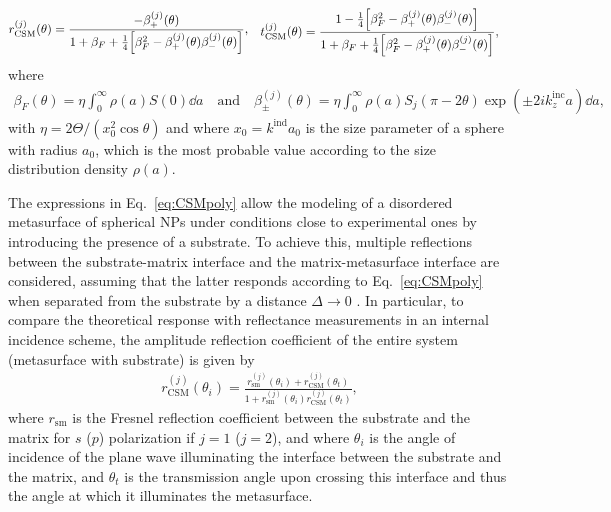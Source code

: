 %
\begin{subequations}%
	\begin{align}%
		r_\text{CSM}^{(j)}(\theta) &= \frac{-\beta_{+}^{(j)}(\theta)}
		{1+\beta_F + \frac{1}{4} \qty[\beta_F^2-\beta_{+}^{(j)}(\theta) \beta_{-}^{(j)}(\theta)]},%
\end{align}%
\begin{align}%
		t_\text{CSM}^{(j)}(\theta) &= \frac{1 - \frac{1}{4}\qty[\beta_F^2- \beta_{+}^{(j)}(\theta)\beta_{-}^{(j)}(\theta)]}
		{1+\beta_F + \frac{1}{4} \qty[\beta_F^2-\beta_{+}^{(j)}(\theta) \beta_{-}^{(j)}(\theta)]},
	\end{align}%
	\label{eq:CSMpoly}%
\end{subequations}%
%
where
%
\begin{align}
	\beta_F(\theta) = \eta \int_{0}^{\infty} \rho(a)S(0)\dd{a}
	\quad\text{and}\quad
	\beta_{\pm}^{(j)}(\theta) = \eta \int_{0}^{\infty} \rho (a)S_{j}(\pi-2\theta)\exp(\pm2ik_z^\text{inc} a)\dd{a},
	\label{eq:betas}
\end{align}%
with $\eta = 2 \Theta/(x_0^2 \cos\theta)$ and where $x_0 = k^\text{ind}a_0$ is the size parameter of a sphere with radius $a_0$, which is the most probable value according to the size distribution density $\rho(a)$.

The expressions in Eq.~\eqref{eq:CSMpoly} allow the modeling of a disordered metasurface of spherical NPs under conditions close to experimental ones by introducing the presence of a substrate. To achieve this, multiple reflections between the substrate-matrix interface and the matrix-metasurface interface are considered, assuming that the latter responds according to Eq.~\eqref{eq:CSMpoly} when separated from the substrate by a distance $\Delta\to 0$ \cite{vazquez-estrada_optical_2014}. In particular, to compare the theoretical response with reflectance measurements in an internal incidence scheme, the amplitude reflection coefficient of the entire system (metasurface with substrate) is given by \cite{vazquez-estrada_optical_2014} 
%
\begin{align}
	r^{(j)}_\text{CSM}(\theta_i)=\frac{r^{(j)}_\text{sm}(\theta_i)+r^{(j)}_\text{CSM}(\theta_t)}{1+r_\text{sm}^{(j)}(\theta_i)r_\text{CSM}^{(j)}(\theta_t)},
\end{align}
%
where $r_\text{sm}$ is the Fresnel reflection coefficient between the substrate and the matrix for $s$ ($p$) polarization if $j=1$ ($j=2$), and where $\theta_i$ is the angle of incidence of the plane wave illuminating the interface between the substrate and the matrix, and $\theta_t$ is the transmission angle upon crossing this interface and thus the angle at which it illuminates the metasurface.



